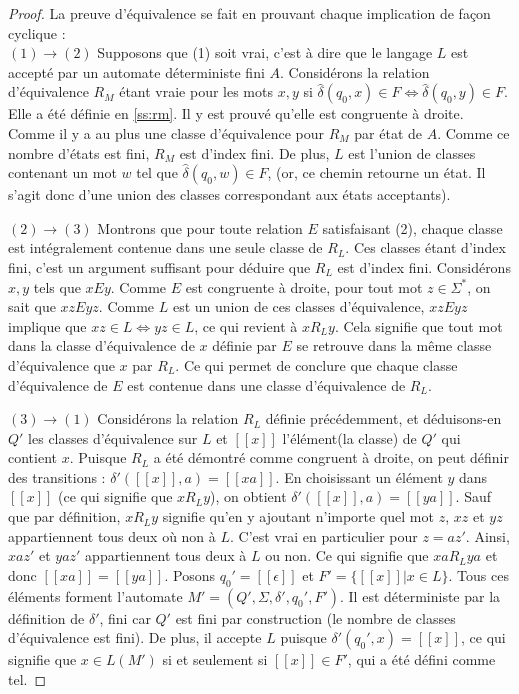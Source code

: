 	\begin{proof}La preuve d'équivalence se fait en prouvant chaque implication de façon cyclique :\\
		
		$(1)\rightarrow(2)$ Supposons que (1) soit vrai, c'est à dire que le langage $L$ est accepté par un automate déterministe fini $A$. Considérons la relation d'équivalence $R_M$ étant vraie pour les mots $x,y$ si $\hat{\delta}(q_0,x)\in F \iff \hat{\delta}(q_0,y)\in F$. Elle a été définie en \ref{ss:rm}. Il y est prouvé qu'elle est congruente à droite. Comme il y a au plus une classe d'équivalence pour $R_M$ par état de $A$. Comme ce nombre d'états est fini, $R_M$ est d'index fini. De plus, $L$ est l'union de classes contenant un mot $w$ tel que $\hat{\delta}(q_0,w) \in F$, (or, ce chemin retourne un état. Il s'agit donc d'une union des classes correspondant aux états acceptants).
		
		$(2)\rightarrow(3)$ Montrons que pour toute relation $E$ satisfaisant (2), chaque classe est intégralement contenue dans une seule classe de $R_L$. Ces classes étant d'index fini, c'est un argument suffisant pour déduire que $R_L$ est d'index fini. Considérons $x,y$ tels que $xEy$. Comme $E$ est congruente à droite, pour tout mot $z \in \Sigma^*$, on sait que $xzEyz$. Comme $L$ est un union de ces classes d'équivalence, $xzEyz$ implique que $xz \in L \Leftrightarrow yz \in L$, ce qui revient à $xR_Ly$. Cela signifie que tout mot dans la classe d'équivalence de $x$ définie par $E$ se retrouve dans la même classe d'équivalence que $x$ par $R_L$. Ce qui permet de conclure que chaque classe d'équivalence de $E$ est contenue dans une classe d'équivalence de $R_L$. 
	
		
		$(3)\rightarrow(1)$ Considérons la relation $R_L$ définie précédemment, et déduisons-en $Q'$ les classes d'équivalence sur $L$ et $[[x]]$ l'élément(la classe) de $Q'$ qui contient $x$. Puisque $R_L$ a été démontré comme congruent à droite, on peut définir des transitions : $\delta'([[x]],a) = [[xa]]$. En choisissant un élément $y$ dans $[[x]]$ (ce qui signifie que $xR_Ly$), on obtient $\delta'([[x]],a)=[[ya]]$. Sauf que par définition, $xR_Ly$ signifie qu'en y ajoutant n'importe quel mot $z$, $xz$ et $yz$ appartiennent tous deux où non à $L$. C'est vrai en particulier pour $z=az'$. Ainsi, $xaz'$ et $yaz'$ appartiennent tous deux à $L$ ou non. Ce qui signifie que $xaR_Lya$ et donc $[[xa]]=[[ya]]$. Posons $q_0'=[[\epsilon]]$ et $F' = \{[[x]]|x \in L\}$. Tous ces éléments forment l'automate $M'=(Q', \Sigma, \delta', q_0', F')$. Il est déterministe par la définition de $\delta'$, fini car $Q'$ est fini par construction (le nombre de classes d'équivalence est fini). De plus, il accepte $L$ puisque $\delta'(q_0',x)=[[x]]$, ce qui signifie que $x \in L(M')$ si et seulement si $[[x]] \in F'$, qui a été défini comme tel.
		
		
	\end{proof}


